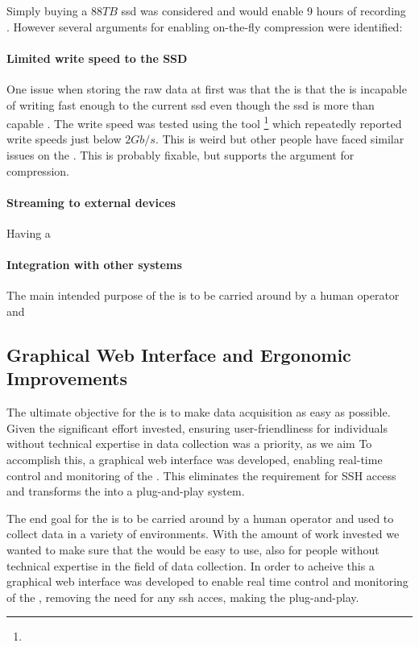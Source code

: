 Simply buying a 8$8TB$ \gls{ssd} was considered and  would enable 9 hours of recording \cite{CorsairMP600PRO}.
However several arguments for enabling on-the-fly compression were identified:
\paragraph{Limited write speed to the SSD}
One issue when storing the raw data at first was that the \jx is that the \jx is incapable of writing fast enough to the current \gls{ssd} even though the \gls{ssd} is more than capable \cite{microntechnologyMicron2300SSD2020}.
The write speed was tested using the  tool
\footnote{}
which repeatedly reported write speeds just below $2Gb/s$.
This is weird but other people have faced similar issues on the \jx \cite{dtyuImbalancedPerformanceRead2018}.
This is probably fixable, but supports the argument for compression.

\paragraph{Streaming to external devices}
Having a

\paragraph{Integration with other systems}
The main intended purpose of the \sr is to be carried around by a human operator and

\subsection{Graphical Web Interface and Ergonomic Improvements}
The ultimate objective for the \sr is to make data acquisition as easy as possible.
Given the significant effort invested, ensuring user-friendliness for individuals without technical expertise in data collection was a priority, as we aim
To accomplish this, a graphical web interface was developed, enabling real-time control and monitoring of the \sr.
This eliminates the requirement for SSH access and transforms the \sr into a plug-and-play system.

The end goal for the \sr is to be carried around by a human operator and used to collect data in a variety of environments.
With the amount of work invested we wanted to make sure that the \sr would be easy to use, also for people without technical expertise in the field of data collection.
In order to acheive this a graphical web interface was developed to enable real time control and monitoring of the \sr, removing the need for any ssh acces, making the \sr plug-and-play.


